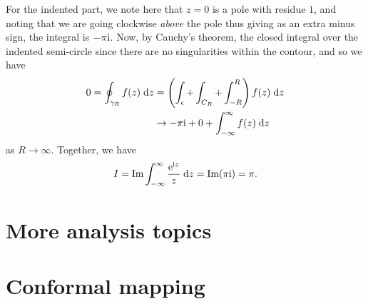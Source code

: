 \documentclass[letter-paper]{tufte-book}
\newenvironment{example}[1][Example]{\begin{trivlist}
\item[\hskip \labelsep {\bfseries #1}]}{\end{trivlist}}
\newcommand{\ex}{\mathrm{e}}
\newcommand{\zi}{{\rm i}}
\begin{document}
\begin{example}
  For the indented part, we note here that $z=0$ is a pole with residue $1$, and
  noting that we are going clockwise \emph{above} the pole thus giving as an
  extra minus sign, the integral is $-\pi \zi$. Now, by Cauchy's theorem, the
  closed integral over the indented semi-circle since there are no singularities
  within the contour, and so we have
  \begin{align*}
    0 = \oint_{\gamma_R} f(z)\; \mathrm{d}z &= \left(\int_\epsilon + \int_{C_R} + \int^R_{-R}\right)f(z)\; \mathrm{d}z \\
      & \to -\pi \zi + 0 + \int^\infty_{-\infty} f(z)\; \mathrm{d}z
  \end{align*}
  as $R\to\infty$. Together, we have
  \begin{equation*}
    I = \mbox{Im} \int_{-\infty}^\infty \frac{\ex^{\zi z}}{z}\; \mathrm{d}z = \mbox{Im} (\pi \zi) = \pi.
  \end{equation*}
\end{example}


\chapter{More analysis topics}


\chapter{Conformal mapping}








\mainmatter




%


\end{document}
